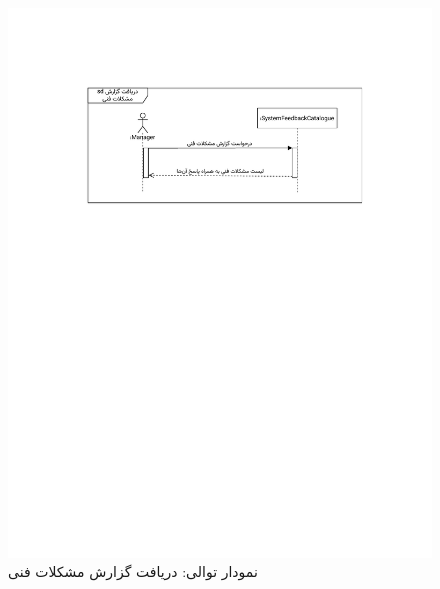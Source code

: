 \begin{figure}[ht!]
	\centering
	\includegraphics[scale=0.8, page=1]{figs/OOD-Sequence-39-40.pdf}
	\caption{نمودار توالی: دریافت گزارش مشکلات فنی}
\end{figure}
\FloatBarrier
\newpage

